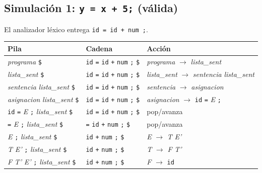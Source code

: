 \documentclass[12pt]{article}
\newcommand{\cmd}[1]{\texttt{\small #1}}
\newcommand{\nt}[1]{\textit{#1}}
\begin{document}
\subsection{Simulación 1: \texttt{y = x + 5;} (válida)}

El analizador léxico entrega \cmd{id = id + num ;}.

\begin{table}[!htbp]
\centering\footnotesize
\renewcommand{\arraystretch}{1.08}
\begin{tabular}{@{}>{\raggedright\arraybackslash}p{5.0cm} >{\raggedright\arraybackslash}p{3.7cm} >{\raggedright\arraybackslash}p{5.6cm}@{}}
\toprule
\textbf{Pila} & \textbf{Cadena} & \textbf{Acción} \\
\midrule
\nt{programa} \texttt{\$} & \texttt{id} \texttt{=} \texttt{id} \texttt{+} \texttt{num} \texttt{;} \texttt{\$} & \nt{programa} $\rightarrow$ \nt{lista\_sent} \\
\nt{lista\_sent} \texttt{\$} & \texttt{id} \texttt{=} \texttt{id} \texttt{+} \texttt{num} \texttt{;} \texttt{\$} & \nt{lista\_sent} $\rightarrow$ \nt{sentencia} \nt{lista\_sent} \\
\nt{sentencia} \nt{lista\_sent} \texttt{\$} & \texttt{id} \texttt{=} \texttt{id} \texttt{+} \texttt{num} \texttt{;} \texttt{\$} & \nt{sentencia} $\rightarrow$ \nt{asignacion} \\
\nt{asignacion} \nt{lista\_sent} \texttt{\$} & \texttt{id} \texttt{=} \texttt{id} \texttt{+} \texttt{num} \texttt{;} \texttt{\$} & \nt{asignacion} $\rightarrow$ \texttt{id} \texttt{=} \nt{E} \texttt{;} \\
\texttt{id} \texttt{=} \nt{E} \texttt{;} \nt{lista\_sent} \texttt{\$} & \texttt{id} \texttt{=} \texttt{id} \texttt{+} \texttt{num} \texttt{;} \texttt{\$} & pop/avanza \\
\texttt{=} \nt{E} \texttt{;} \nt{lista\_sent} \texttt{\$} & \texttt{=} \texttt{id} \texttt{+} \texttt{num} \texttt{;} \texttt{\$} & pop/avanza \\
\nt{E} \texttt{;} \nt{lista\_sent} \texttt{\$} & \texttt{id} \texttt{+} \texttt{num} \texttt{;} \texttt{\$} & \nt{E} $\rightarrow$ \nt{T} \nt{E'} \\
\nt{T} \nt{E'} \texttt{;} \nt{lista\_sent} \texttt{\$} & \texttt{id} \texttt{+} \texttt{num} \texttt{;} \texttt{\$} & \nt{T} $\rightarrow$ \nt{F} \nt{T'} \\
\nt{F} \nt{T'} \nt{E'} \texttt{;} \nt{lista\_sent} \texttt{\$} & \texttt{id} \texttt{+} \texttt{num} \texttt{;} \texttt{\$} & \nt{F} $\rightarrow$ \texttt{id} \\

\end{tabular}
\end{table}
\end{document}
